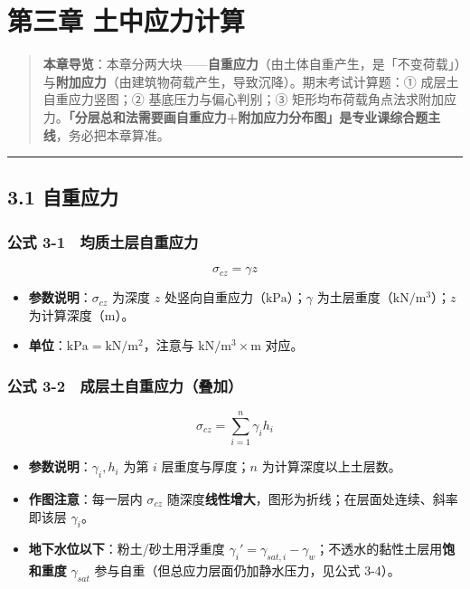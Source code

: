 \documentclass[
]{article}
\author{}
\date{}
\providecommand{\tightlist}{%
  \setlength{\itemsep}{0pt}\setlength{\parskip}{0pt}}
\begin{document}
\section{第三章
土中应力计算}\label{ux7b2cux4e09ux7ae0-ux571fux4e2dux5e94ux529bux8ba1ux7b97}

\begin{quote}
\textbf{本章导览}：本章分两大块------\textbf{自重应力}（由土体自重产生，是「不变荷载」）与\textbf{附加应力}（由建筑物荷载产生，导致沉降）。期末考试计算题：①
成层土自重应力竖图；② 基底压力与偏心判别；③
矩形均布荷载角点法求附加应力。\textbf{「分层总和法需要画自重应力+附加应力分布图」是专业课综合题主线}，务必把本章算准。
\end{quote}

\begin{center}\rule{0.5\linewidth}{0.5pt}\end{center}

\subsection{3.1 自重应力}\label{ux81eaux91cdux5e94ux529b}

\subsubsection{公式
3-1　均质土层自重应力}\label{ux516cux5f0f-3-1-ux5747ux8d28ux571fux5c42ux81eaux91cdux5e94ux529b}

\[\sigma_{cz}=\gamma z\]

\begin{itemize}
\tightlist
\item
  \textbf{参数说明}：\(\sigma_{cz}\) 为深度 \(z\)
  处竖向自重应力（\(\mathrm{kPa}\)）；\(\gamma\)
  为土层重度（\(\mathrm{kN/m^3}\)）；\(z\) 为计算深度（m）。
\item
  \textbf{单位}：\(\mathrm{kPa}=\mathrm{kN/m^2}\)，注意与
  \(\mathrm{kN/m^3}\times\mathrm{m}\) 对应。
\end{itemize}

\subsubsection{公式
3-2　成层土自重应力（叠加）}\label{ux516cux5f0f-3-2-ux6210ux5c42ux571fux81eaux91cdux5e94ux529bux53e0ux52a0}

\[\sigma_{cz}=\sum_{i=1}^{n}\gamma_i h_i\]

\begin{itemize}
\tightlist
\item
  \textbf{参数说明}：\(\gamma_i,h_i\) 为第 \(i\) 层重度与厚度；\(n\)
  为计算深度以上土层数。
\item
  \textbf{作图注意}：每一层内 \(\sigma_{cz}\)
  随深度\textbf{线性增大}，图形为折线；在层面处连续、斜率即该层
  \(\gamma_i\)。
\item
  \textbf{地下水位以下}：粉土/砂土用浮重度
  \(\gamma_i'=\gamma_{sat,i}-\gamma_w\)；不透水的黏性土层用\textbf{饱和重度}
  \(\gamma_{sat}\) 参与自重（但总应力层面仍加静水压力，见公式 3-4）。
\end{itemize}
\end{document}
